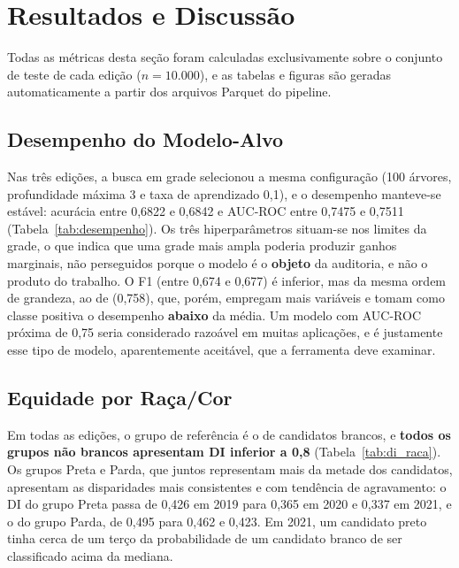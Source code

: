 \section{Resultados e Discussão}
\label{sec:resultados}

Todas as métricas desta seção foram calculadas exclusivamente sobre o conjunto de teste de cada edição ($n = 10.000$), e as tabelas e figuras são geradas automaticamente a partir dos arquivos Parquet do pipeline.

\subsection{Desempenho do Modelo-Alvo}
\label{sec:res_desempenho}

Nas três edições, a busca em grade selecionou a mesma configuração (100 árvores, profundidade máxima 3 e taxa de aprendizado 0,1), e o desempenho manteve-se estável: acurácia entre 0,6822 e 0,6842 e AUC-ROC entre 0,7475 e 0,7511 (Tabela~\ref{tab:desempenho}). Os três hiperparâmetros situam-se nos limites da grade, o que indica que uma grade mais ampla poderia produzir ganhos marginais, não perseguidos porque o modelo é o \textbf{objeto} da auditoria, e não o produto do trabalho. O F1 (entre 0,674 e 0,677) é inferior, mas da mesma ordem de grandeza, ao de \cite{luz2025uso} (0,758), que, porém, empregam mais variáveis e tomam como classe positiva o desempenho \textbf{abaixo} da média. Um modelo com AUC-ROC próxima de 0,75 seria considerado razoável em muitas aplicações, e é justamente esse tipo de modelo, aparentemente aceitável, que a ferramenta deve examinar.



\subsection{Equidade por Raça/Cor}
\label{sec:res_raca}

Em todas as edições, o grupo de referência é o de candidatos brancos, e \textbf{todos os grupos não brancos apresentam DI inferior a 0,8} (Tabela~\ref{tab:di_raca}). Os grupos Preta e Parda, que juntos representam mais da metade dos candidatos, apresentam as disparidades mais consistentes e com tendência de agravamento: o DI do grupo Preta passa de 0,426 em 2019 para 0,365 em 2020 e 0,337 em 2021, e o do grupo Parda, de 0,495 para 0,462 e 0,423. Em 2021, um candidato preto tinha cerca de um terço da probabilidade de um candidato branco de ser classificado acima da mediana.

